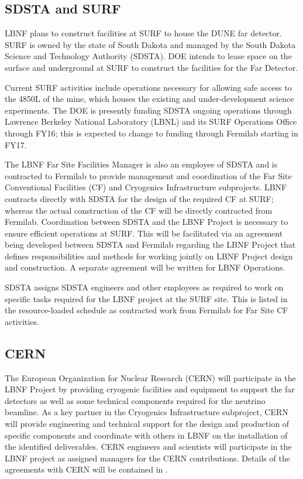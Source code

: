  
\subsection{SDSTA and SURF}
 
LBNF plans to construct facilities at SURF to house the DUNE far detector. SURF is owned by the state of South Dakota and managed by the South Dakota Science and Technology Authority (SDSTA). DOE intends to lease space on the surface and underground at SURF to construct the facilities for the Far Detector.  
 
Current SURF activities include operations necessary for allowing safe access to the 4850L of the mine, which houses the existing and under-development science experiments. The DOE is presently funding SDSTA ongoing operations through Lawrence Berkeley National Laboratory (LBNL) and its SURF Operations Office through FY16; this is expected to change to funding through Fermilab starting in FY17.
 
The LBNF Far Site Facilities Manager is also an employee of SDSTA and is contracted to Fermilab to provide management and coordination of the Far Site Conventional Facilities (CF) and Cryogenics Infrastructure subprojects. LBNF contracts directly with SDSTA for the design of the required CF at SURF; whereas the actual construction of the CF will be directly contracted from Fermilab. Coordination between SDSTA and the LBNF Project is necessary to ensure efficient operations at SURF. This will be facilitated via an agreement being developed between SDSTA and Fermilab regarding the LBNF Project  that defines responsibilities and methods for working jointly on LBNF Project design and construction. A separate agreement will be written for LBNF Operations.
 
SDSTA assigns SDSTA engineers and other employees as required to work on specific tasks required for the LBNF project at the SURF site. This is listed in the resource-loaded schedule as contracted work from Fermilab for Far Site CF activities.
 
 
\subsection{CERN}
 
The European Organization for Nuclear Research (CERN) will participate in the LBNF Project by providing cryogenic facilities and equipment to support the far detectors as well as some technical components required for the neutrino beamline. As a key partner in the Cryogenics Infrastructure subproject, CERN will provide engineering and technical support for the design and production of specific components and coordinate with others in LBNF on the installation of the identified deliverables. CERN engineers and scientists will participate in the LBNF project as assigned managers for the CERN contributions.
Details of the agreements with CERN will be contained in .
 
